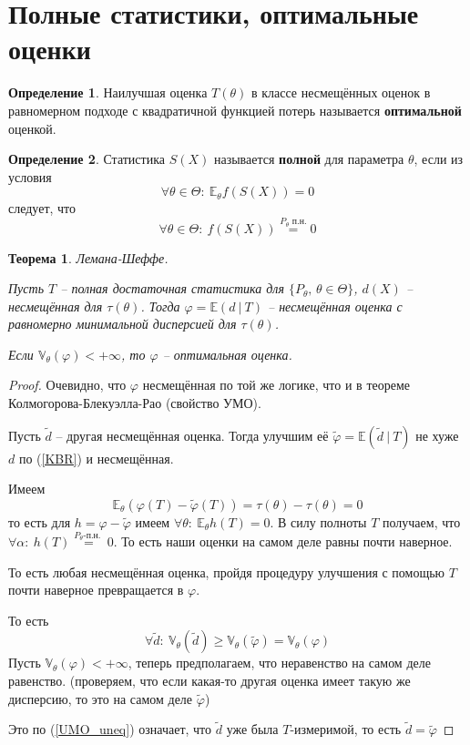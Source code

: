\documentclass[a4paper,12pt]{article}
\renewcommand{\phi}{\ensuremath{\varphi}}
\renewcommand{\geq}{\ensuremath{\geqslant}}
\theoremstyle{plain}
\newtheorem{theorem}{Теорема}[section]
\theoremstyle{definition}
\newtheorem{definition}{Определение}[section]
\theoremstyle{remark}
\begin{document}
\section{Полные статистики, оптимальные оценки}
\begin{definition}
  Наилучшая оценка $T(\theta)$ в классе несмещённых оценок в равномерном подходе с квадратичной функцией потерь называется \textbf{оптимальной} оценкой.
\end{definition}

\begin{definition}
  Статистика $S(X)$ называется \textbf{полной} для параметра $\theta$, если из условия 
  \[
    \forall \theta \in \Theta :\: \mathbb{E}_\theta f(S(X)) = 0
  \]
  следует, что
  \[
    \forall \theta \in \Theta :\: f(S(X)) \overset{P_\theta\text{ п.н.}}{=} 0
  \]
\end{definition}

\begin{theorem}
  Лемана-Шеффе.

  Пусть $T$ -- полная достаточная статистика для $\{P_\theta,\, \theta \in \Theta\}$, $d(X)$ -- несмещённая для $\tau(\theta)$. Тогда $\phi = \mathbb{E}(d \:\vert\: T)$ -- несмещённая оценка с равномерно минимальной дисперсией для $\tau(\theta)$.

  Если $\mathbb{V}_\theta(\phi) < +\infty$, то $\phi$ -- оптимальная оценка.
\end{theorem}

\begin{proof}
  Очевидно, что $\phi$ несмещённая по той же логике, что и в теореме Колмогорова-Блекуэлла-Рао (свойство УМО).
  
  Пусть $\tilde{d}$ -- другая несмещённая оценка. Тогда улучшим её $\tilde{\phi} = \mathbb{E}(\tilde{d} \:\vert\: T)$ не хуже $d$ по (\ref{KBR}) и несмещённая.
  
  Имеем 
  \[
    \mathbb{E}_\theta(\phi(T) - \tilde{\phi}(T)) = \tau(\theta) - \tau(\theta) = 0
  \]
  то есть для $h = \phi - \tilde{\phi}$ имеем $\forall \theta :\: \mathbb{E}_\theta h(T) = 0$. В силу полноты $T$ получаем, что $\forall \alpha :\: h(T) \overset{P_\theta \text{-п.н. }}{=} 0$. То есть наши оценки на самом деле равны почти наверное.

  То есть любая несмещённая оценка, пройдя процедуру улучшения с помощью $T$ почти наверное превращается в $\phi$.

  То есть 
  \[
    \forall \tilde{d} :\: \mathbb{V}_\theta(\tilde{d}) \geq \mathbb{V}_\theta(\tilde{\phi}) = \mathbb{V}_\theta(\phi)
  \]
  Пусть $\mathbb{V}_\theta(\phi) < +\infty$, теперь предполагаем, что неравенство на самом деле равенство. (проверяем, что если какая-то другая оценка имеет такую же дисперсию, то это на самом деле $\tilde{\phi}$) 

  Это по (\ref{UMO_uneq}) означает, что $\tilde{d}$ уже была $T$-измеримой, то есть $\tilde{d} = \tilde{\phi}$
\end{proof}
\end{document}
